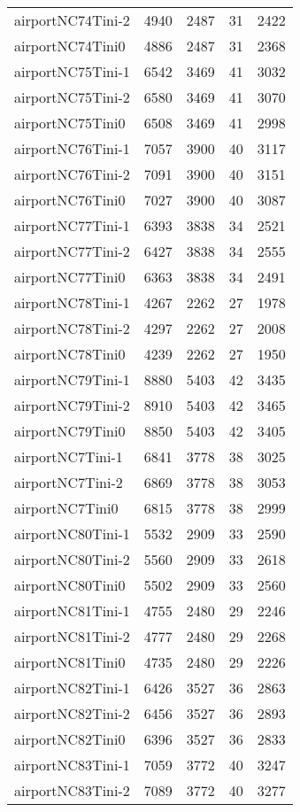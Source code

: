 \documentclass[../../../thesis.tex]{subfiles}
\begin{document}
\begin{longtable}{lrrrr}
airportNC74Tini-2 & 4940 & 2487 & 31 & 2422 \\
airportNC74Tini0 & 4886 & 2487 & 31 & 2368 \\
airportNC75Tini-1 & 6542 & 3469 & 41 & 3032 \\
airportNC75Tini-2 & 6580 & 3469 & 41 & 3070 \\
airportNC75Tini0 & 6508 & 3469 & 41 & 2998 \\
airportNC76Tini-1 & 7057 & 3900 & 40 & 3117 \\
airportNC76Tini-2 & 7091 & 3900 & 40 & 3151 \\
airportNC76Tini0 & 7027 & 3900 & 40 & 3087 \\
airportNC77Tini-1 & 6393 & 3838 & 34 & 2521 \\
airportNC77Tini-2 & 6427 & 3838 & 34 & 2555 \\
airportNC77Tini0 & 6363 & 3838 & 34 & 2491 \\
airportNC78Tini-1 & 4267 & 2262 & 27 & 1978 \\
airportNC78Tini-2 & 4297 & 2262 & 27 & 2008 \\
airportNC78Tini0 & 4239 & 2262 & 27 & 1950 \\
airportNC79Tini-1 & 8880 & 5403 & 42 & 3435 \\
airportNC79Tini-2 & 8910 & 5403 & 42 & 3465 \\
airportNC79Tini0 & 8850 & 5403 & 42 & 3405 \\
airportNC7Tini-1 & 6841 & 3778 & 38 & 3025 \\
airportNC7Tini-2 & 6869 & 3778 & 38 & 3053 \\
airportNC7Tini0 & 6815 & 3778 & 38 & 2999 \\
airportNC80Tini-1 & 5532 & 2909 & 33 & 2590 \\
airportNC80Tini-2 & 5560 & 2909 & 33 & 2618 \\
airportNC80Tini0 & 5502 & 2909 & 33 & 2560 \\
airportNC81Tini-1 & 4755 & 2480 & 29 & 2246 \\
airportNC81Tini-2 & 4777 & 2480 & 29 & 2268 \\
airportNC81Tini0 & 4735 & 2480 & 29 & 2226 \\
airportNC82Tini-1 & 6426 & 3527 & 36 & 2863 \\
airportNC82Tini-2 & 6456 & 3527 & 36 & 2893 \\
airportNC82Tini0 & 6396 & 3527 & 36 & 2833 \\
airportNC83Tini-1 & 7059 & 3772 & 40 & 3247 \\
airportNC83Tini-2 & 7089 & 3772 & 40 & 3277 \\

\end{longtable}
\end{document}

